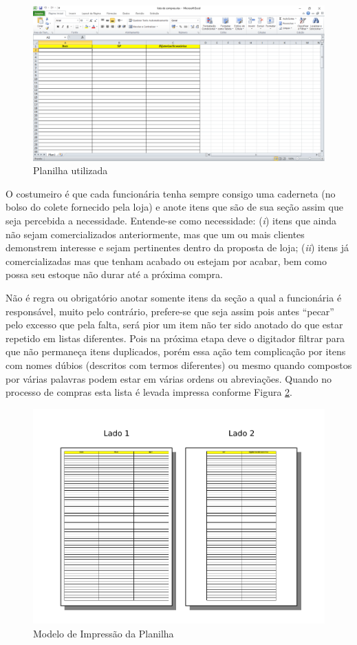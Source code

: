 \documentclass[12pt]{article}
\begin{document}
\begin{figure}[ht]
\centering
\includegraphics[width=.9\textwidth,keepaspectratio]{figures/lista-excel.pdf}
\caption{Planilha utilizada}
\label{fig:planilha}
\end{figure}

O costumeiro é que cada funcionária tenha sempre consigo uma caderneta (no bolso do colete fornecido pela loja) e anote itens que são de sua seção assim que seja percebida a necessidade. Entende-se como necessidade: (\textit{i}) itens que ainda não sejam comercializados anteriormente, mas que um ou mais clientes demonstrem interesse e sejam pertinentes dentro da proposta de loja; (\textit{ii}) itens já comercializadas mas que tenham acabado ou estejam por acabar, bem como possa seu estoque não durar até a próxima compra.

Não é regra ou obrigatório anotar somente itens da seção a qual a funcionária é responsável, muito pelo contrário, prefere-se que seja assim pois antes ``pecar'' pelo excesso que pela falta, será pior um item não ter sido anotado do que estar repetido em listas diferentes. Pois na próxima etapa deve o digitador filtrar para que não permaneça itens duplicados, porém essa ação tem complicação por itens com nomes dúbios (descritos com termos diferentes) ou mesmo quando compostos por várias palavras podem estar em várias ordens ou abreviações. Quando no processo de compras esta lista é levada impressa conforme Figura \ref{fig:impressao}.

\begin{figure}[ht]
\centering
\includegraphics[width=.9\textwidth,keepaspectratio]{figures/modelo-impressao.pdf}
\caption{Modelo de Impressão da Planilha}
\label{fig:impressao}
\end{figure}
\end{document}
